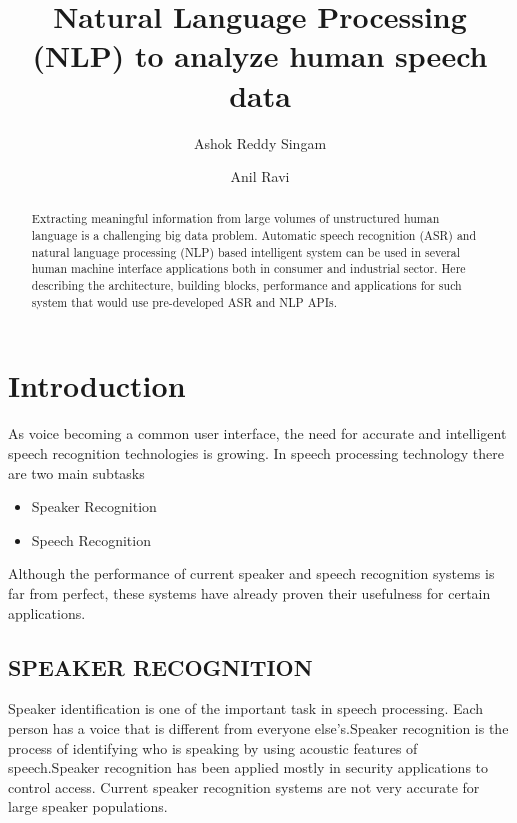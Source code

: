 \documentclass[sigconf]{acmart}
\begin{document}
\title{Natural Language Processing (NLP) to analyze human speech data}

\author{Ashok Reddy Singam}

\author{Anil Ravi}

\begin{abstract}
Extracting meaningful information from large volumes of unstructured human language is a challenging big data problem. Automatic speech recognition (ASR) and natural language processing (NLP) based intelligent system can be  used in several human machine interface applications both in consumer and industrial sector. Here describing the architecture, building blocks, performance and applications for such system that would use pre-developed ASR and NLP APIs.
\end{abstract}



\maketitle


\section{Introduction}
As voice becoming a common user interface, the need for accurate and intelligent speech recognition technologies is growing. In speech processing technology there are two main subtasks 
   \begin{itemize}
     \item Speaker Recognition
     \item Speech Recognition
   \end{itemize}
Although the performance of current speaker and speech  recognition systems is far from perfect, these  systems  have already proven their usefulness for certain applications. 
\subsection{SPEAKER RECOGNITION}
Speaker identification is one of the important task in speech processing. Each person has a voice that is different from everyone else’s.Speaker recognition is the process of identifying who is speaking by using acoustic features of speech.Speaker recognition has been applied mostly in security applications to control access. Current speaker recognition systems are not very accurate for large speaker populations. 
\end{document}
